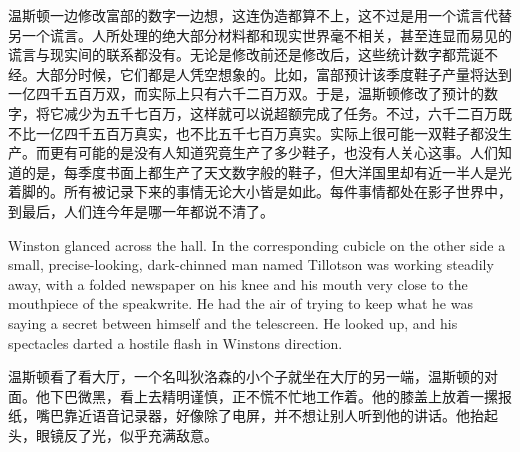 \begin{paracol}{2}
温斯顿一边修改富部的数字一边想，这连伪造都算不上，这不过是用一个谎言代替另一个谎言。人所处理的绝大部分材料都和现实世界毫不相关，甚至连显而易见的谎言与现实间的联系都没有。无论是修改前还是修改后，这些统计数字都荒诞不经。大部分时候，它们都是人凭空想象的。比如，富部预计该季度鞋子产量将达到一亿四千五百万双，而实际上只有六千二百万双。于是，温斯顿修改了预计的数字，将它减少为五千七百万，这样就可以说超额完成了任务。不过，六千二百万既不比一亿四千五百万真实，也不比五千七百万真实。实际上很可能一双鞋子都没生产。而更有可能的是没有人知道究竟生产了多少鞋子，也没有人关心这事。人们知道的是，每季度书面上都生产了天文数字般的鞋子，但大洋国里却有近一半人是光着脚的。所有被记录下来的事情无论大小皆是如此。每件事情都处在影子世界中，到最后，人们连今年是哪一年都说不清了。

\switchcolumn*

Winston glanced across the hall. In the corresponding cubicle on the
other side a small, precise-looking, dark-chinned man named Tillotson
was working steadily away, with a folded newspaper on his knee and his
mouth very close to the mouthpiece of the speakwrite. He had the air of
trying to keep what he was saying a secret between himself and the
telescreen. He looked up, and his spectacles darted a hostile flash in
Winston\textquotesingle s direction.

\switchcolumn

温斯顿看了看大厅，一个名叫狄洛森的小个子就坐在大厅的另一端，温斯顿的对面。他下巴微黑，看上去精明谨慎，正不慌不忙地工作着。他的膝盖上放着一摞报纸，嘴巴靠近语音记录器，好像除了电屏，并不想让别人听到他的讲话。他抬起头，眼镜反了光，似乎充满敌意。

\switchcolumn*


\end{paracol}
